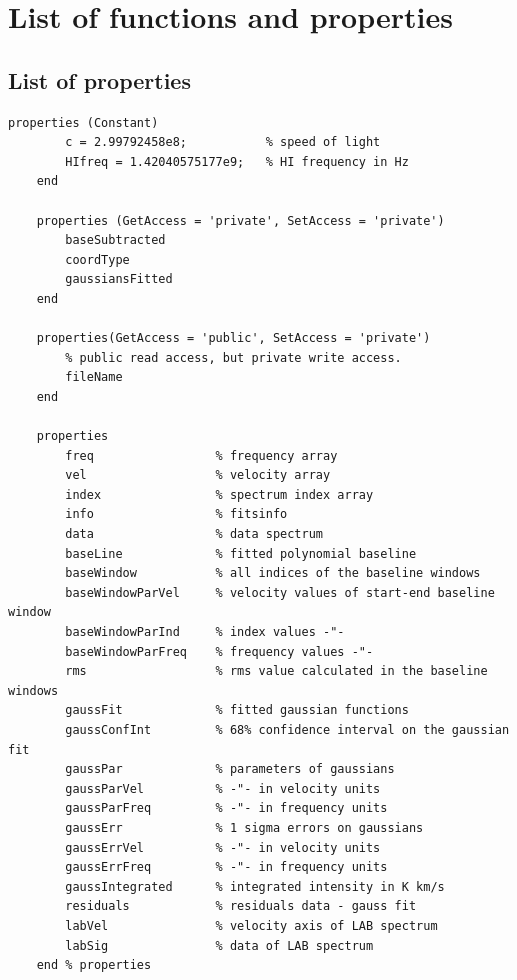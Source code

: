 \documentclass[11pt,a4paper]{article}
\begin{document}
\section{List of functions and properties}
\label{sec:list-funct-param}

\subsection{List of properties}
\label{sec:list-properties}

\begin{lstlisting}[framerule=0pt]
    properties (Constant)
        c = 2.99792458e8;           % speed of light
        HIfreq = 1.42040575177e9;   % HI frequency in Hz
    end
    
    properties (GetAccess = 'private', SetAccess = 'private')
        baseSubtracted
        coordType
        gaussiansFitted
    end
    
    properties(GetAccess = 'public', SetAccess = 'private')
        % public read access, but private write access.
        fileName
    end
    
    properties
        freq                 % frequency array
        vel                  % velocity array
        index                % spectrum index array
        info                 % fitsinfo
        data                 % data spectrum
        baseLine             % fitted polynomial baseline
        baseWindow           % all indices of the baseline windows
        baseWindowParVel     % velocity values of start-end baseline window
        baseWindowParInd     % index values -"-
        baseWindowParFreq    % frequency values -"-
        rms                  % rms value calculated in the baseline windows
        gaussFit             % fitted gaussian functions
        gaussConfInt         % 68% confidence interval on the gaussian fit
        gaussPar             % parameters of gaussians
        gaussParVel          % -"- in velocity units
        gaussParFreq         % -"- in frequency units
        gaussErr             % 1 sigma errors on gaussians
        gaussErrVel          % -"- in velocity units
        gaussErrFreq         % -"- in frequency units
        gaussIntegrated      % integrated intensity in K km/s
        residuals            % residuals data - gauss fit
        labVel               % velocity axis of LAB spectrum
        labSig               % data of LAB spectrum        
    end % properties
\end{lstlisting}
\end{document}

